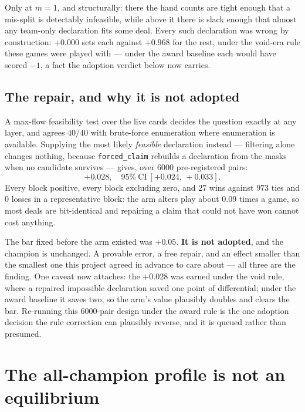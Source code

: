 \documentclass[11pt,a4paper]{article}
\begin{document}
Only at $m = 1$, and structurally: there the hand counts are tight enough that
a mis-split is detectably infeasible, while above it there is slack enough that
almost any team-only declaration fits some deal. Every such declaration was
wrong by construction: $+0.000$ sets each against $+0.968$ for the rest,
under the void-era rule these games were played with --- under the award
baseline each would have scored $-1$, a fact the adoption verdict below now
carries.

\subsection{The repair, and why it is not adopted}

A max-flow feasibility test over the live cards decides the question exactly at
any layer, and agrees $40/40$ with brute-force enumeration where enumeration is
available. Supplying the most likely \emph{feasible} declaration instead ---
filtering alone changes nothing, because \texttt{forced\_claim} rebuilds a
declaration from the masks when no candidate survives --- gives, over $6000$
pre-registered pairs:
\[
+0.028,\quad 95\%\ \text{CI}\ [+0.024,\, +0.033].
\]
Every block positive, every block excluding zero, and $27$ wins against $973$
ties and $0$ losses in a representative block: the arm alters play about $0.09$
times a game, so most deals are bit-identical and repairing a claim that could
not have won cannot cost anything.

The bar fixed before the arm existed was $+0.05$. \textbf{It is not adopted},
and the champion is unchanged. A provable error, a free repair, and an effect
smaller than the smallest one this project agreed in advance to care about ---
all three are the finding. One caveat now attaches: the $+0.028$ was earned
under the void rule, where a repaired impossible declaration saved one point
of differential; under the award baseline it saves two, so the arm's value
plausibly doubles and clears the bar. Re-running this 6000-pair design under
the award rule is the one adoption decision the rule correction can
plausibly reverse, and it is queued rather than presumed.

\section{The all-champion profile is not an equilibrium}
\label{sec:noneq}
\end{document}
